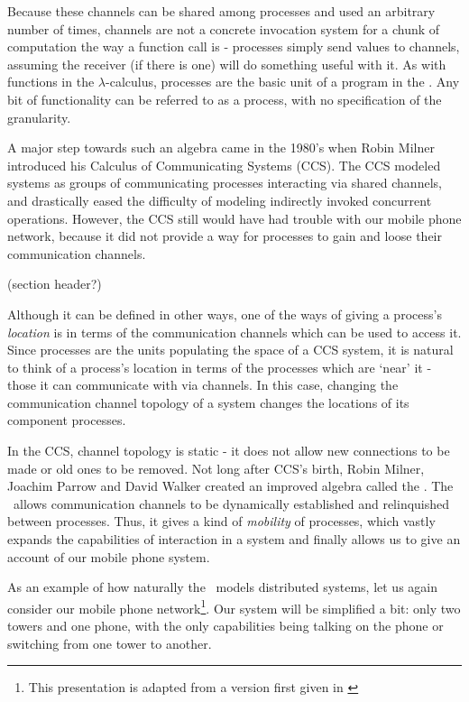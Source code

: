 Because these channels can be shared among processes and used an arbitrary number of times, channels are not a concrete invocation system for a chunk of computation the way a function call is - processes simply send values to channels, assuming the receiver (if there is one) will do something useful with it.  As with functions in the $\lambda$-calculus, processes are the basic unit of a program in the \picalc. Any bit of functionality can be referred to as a process, with no specification of the granularity.

A major step towards such an algebra came in the 1980's when Robin Milner introduced his Calculus of Communicating Systems (CCS).   The CCS modeled systems as groups of communicating processes interacting via shared channels, and drastically eased the difficulty of modeling indirectly invoked concurrent operations.  However, the CCS still would have had trouble with our mobile phone network, because it did not provide a way for processes to gain and loose their communication channels.

(section header?)

	Although it can be defined in other ways, one of the ways of giving a process's \emph{location} is in terms of the communication channels which can be used to access it.  Since processes are the units populating the space of a CCS system, it is natural to think of a process's location in terms of the processes which are `near' it - those it can communicate with via channels.  In this case, changing the communication channel topology of a system changes the locations of its component processes.  
	
	In the CCS, channel topology is static - it does not allow new connections to be made or old ones to be removed.  Not long after CCS's birth, Robin Milner, Joachim Parrow and David Walker created an improved algebra called the \picalc.  The \picalc\ allows communication channels to be dynamically established and relinquished between processes.  Thus, it gives a kind of \emph{mobility} of processes, which vastly expands the capabilities of interaction in a system and finally allows us to give an account of our mobile phone system.
	
	As an example of how naturally the \picalc\ models distributed systems, let us again consider our mobile phone network\footnote{This presentation is adapted from a version first given in \cite{miln99}}.    Our system will be simplified a bit: only two towers and one phone, with the only capabilities being talking on the phone or switching from one tower to another.
	
